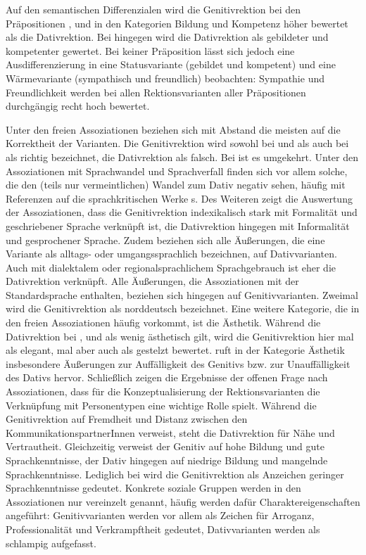 Auf den semantischen Differenzialen wird die Genitivrektion bei den Präpositionen \wegen{}, \waehrend{} und \dank{} in den Kategorien \glqq Bildung\grqq{} und \glqq Kompetenz\grqq{} höher bewertet als die Dativrektion. 
Bei \gegenueber{} hingegen wird die Dativrektion als gebildeter und kompetenter gewertet. 
Bei keiner Präposition lässt sich jedoch eine Ausdifferenzierung in eine Statusvariante (gebildet und kompetent) und eine Wärmevariante (sympathisch und freundlich) beobachten:
Sympathie und Freundlichkeit werden bei allen Rektionsvarianten aller Präpositionen durchgängig recht hoch bewertet. 

Unter den freien Assoziationen beziehen sich mit Abstand die meisten auf die Korrektheit der Varianten.
Die Genitivrektion wird sowohl bei \wegen{} und \waehrend{} als auch bei \dank{} als richtig bezeichnet, die Dativrektion als falsch. 
Bei \gegenueber{} ist es umgekehrt. 
Unter den Assoziationen mit Sprachwandel und Sprachverfall finden sich vor allem solche, die den (teils nur vermeintlichen) Wandel zum Dativ negativ sehen, häufig mit Referenzen auf die sprachkritischen Werke \citeauthor{Sick2006}s. 
Des Weiteren zeigt die Auswertung der Assoziationen, dass die Genitivrektion indexikalisch stark mit Formalität und geschriebener Sprache verknüpft ist, die Dativrektion hingegen mit Informalität und gesprochener Sprache.
Zudem beziehen sich alle Äußerungen, die eine Variante als alltags- oder umgangssprachlich bezeichnen, auf Dativvarianten. 
Auch mit dialektalem oder regionalsprachlichem Sprachgebrauch ist eher die Dativrektion verknüpft. 
Alle Äußerungen, die Assoziationen mit der Standardsprache enthalten, beziehen sich hingegen auf Genitivvarianten. 
Zweimal wird die Genitivrektion als norddeutsch bezeichnet. 
Eine weitere Kategorie, die in den freien Assoziationen häufig vorkommt, ist die Ästhetik. 
Während die Dativrektion bei \wegen, \waehrend{} und \dank{} als wenig ästhetisch gilt, wird die Genitivrektion hier mal als elegant, mal aber auch als gestelzt bewertet. 
 ruft in der Kategorie \glqq Ästhetik\grqq{} insbesondere Äußerungen zur Auffälligkeit des Genitivs bzw. zur Unauffälligkeit des Dativs hervor. 
Schließlich zeigen die Ergebnisse der offenen Frage nach Assoziationen, dass für die Konzeptualisierung der Rektionsvarianten die Verknüpfung mit Personentypen eine wichtige Rolle spielt. 
Während die Genitivrektion auf Fremdheit und Distanz zwischen den KommunikationspartnerInnen verweist, steht die Dativrektion für Nähe und Vertrautheit. 
Gleichzeitig verweist der Genitiv auf hohe Bildung und gute Sprachkenntnisse, der Dativ hingegen auf niedrige Bildung und mangelnde Sprachkenntnisse. 
Lediglich bei \gegenueber{} wird die Genitivrektion als Anzeichen geringer Sprachkenntnisse gedeutet. 
Konkrete soziale Gruppen werden in den Assoziationen nur vereinzelt genannt, häufig werden dafür Charaktereigenschaften angeführt:
Genitivvarianten werden vor allem als Zeichen für Arroganz, Professionalität und Verkrampftheit gedeutet, Dativvarianten werden als schlampig aufgefasst. 

